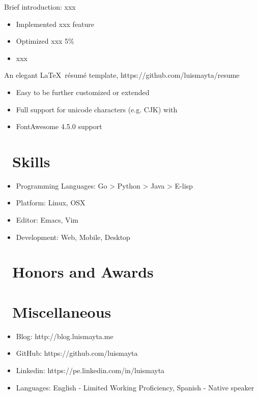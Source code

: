 \documentclass{resume}
\begin{document}
Brief introduction: xxx
\begin{itemize}
  \item Implemented xxx feature
  \item Optimized xxx 5\%
  \item xxx
\end{itemize}

An elegant \LaTeX\ résumé template, https://github.com/luismayta/resume
\begin{itemize}
  \item Easy to be further customized or extended
  \item Full support for unicode characters (e.g. CJK) with \XeLaTeX\
  \item FontAwesome 4.5.0 support
\end{itemize}


\section{\faCogs\ Skills}
\begin{itemize}[parsep=0.5ex]
  \item Programming Languages: Go > Python > Java > E-lisp
  \item Platform: Linux, OSX
  \item Editor: Emacs, Vim
  \item Development: Web, Mobile, Desktop
\end{itemize}

\section{\faHeartO\ Honors and Awards}

\section{\faInfo\ Miscellaneous}
\begin{itemize}[parsep=0.5ex]
  \item Blog: http://blog.luismayta.me
  \item GitHub: https://github.com/luismayta
  \item Linkedin: https://pe.linkedin.com/in/luismayta
  \item Languages: English - Limited Working Proficiency, Spanish - Native speaker
\end{itemize}

%
%
\end{document}
